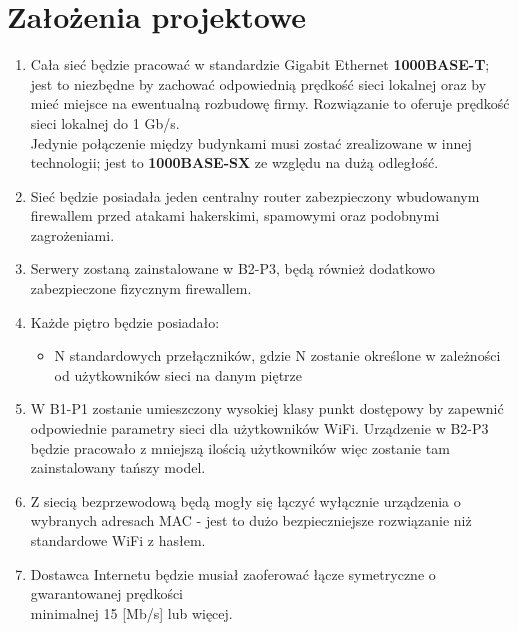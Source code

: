 \documentclass{article}
\begin{document}
\newpage
\section{Założenia projektowe}

\begin{enumerate}
	\item Cała sieć będzie pracować w standardzie Gigabit Ethernet \textbf{1000BASE-T}; jest to niezbędne by zachować odpowiednią prędkość sieci lokalnej oraz by mieć miejsce na ewentualną rozbudowę firmy. Rozwiązanie to oferuje prędkość sieci lokalnej do 1 Gb/s. 
	\\ Jedynie połączenie między budynkami musi zostać zrealizowane w innej technologii; jest to \textbf{1000BASE-SX} ze względu na dużą odległość.
	\item Sieć będzie posiadała jeden centralny router zabezpieczony wbudowanym firewallem przed atakami hakerskimi, spamowymi oraz podobnymi zagrożeniami.
	\item Serwery zostaną zainstalowane w B2-P3, będą również dodatkowo zabezpieczone fizycznym firewallem.
	\item Każde piętro będzie posiadało:
	\begin{itemize}
		\item N standardowych przełączników, gdzie N zostanie określone w zależności od użytkowników sieci na danym piętrze
	\end{itemize}
	\item W B1-P1 zostanie umieszczony wysokiej klasy punkt dostępowy by zapewnić odpowiednie parametry sieci dla użytkowników WiFi. Urządzenie w B2-P3 będzie pracowało z mniejszą ilością użytkowników więc zostanie tam zainstalowany tańszy model.
	\item Z siecią bezprzewodową będą mogły się łączyć wyłącznie urządzenia o wybranych adresach MAC - jest to dużo bezpieczniejsze rozwiązanie niż standardowe WiFi z hasłem.
	\item Dostawca Internetu będzie musiał zaoferować łącze symetryczne o gwarantowanej prędkości \\ minimalnej 15 [Mb/s] lub więcej.
\end{enumerate}
\end{document}
